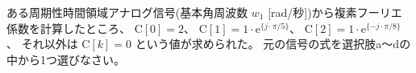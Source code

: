 ある周期性時間領域アナログ信号(基本角周波数  $w_1$ [rad/秒])から複素フーリエ係数を計算したところ、
$\textrm{C}[0] = 2$、
$\textrm{C}[1] = 1 \cdot \textrm{e}^{\{ j \cdot \pi/5 \}}$、
$\textrm{C}[2] = 1 \cdot \textrm{e}^{\{ -j \cdot \pi/8 \}}$ 、
それ以外は $\textrm{C}[k] = 0$ という値が求められた。
元の信号の式を選択肢a〜dの中から1つ選びなさい。
